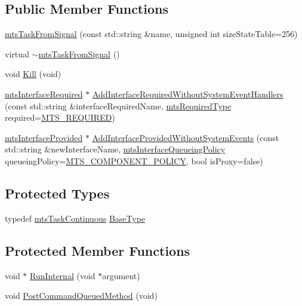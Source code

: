 \subsection*{Public Member Functions}
\begin{DoxyCompactItemize}
\item 
\hyperlink{classmts_task_from_signal_a6a5603846ff3b161a939aee0ba766350}{mts\+Task\+From\+Signal} (const std\+::string \&name, unsigned int size\+State\+Table=256)
\item 
virtual \hyperlink{classmts_task_from_signal_a4bdd61afb997d0c2e1da6697de1650a5}{$\sim$mts\+Task\+From\+Signal} ()
\item 
void \hyperlink{classmts_task_from_signal_a9a1b6e7c80ca2c2fdc14de78e3635922}{Kill} (void)
\item 
\hyperlink{classmts_interface_required}{mts\+Interface\+Required} $\ast$ \hyperlink{classmts_task_from_signal_ab3cec57b1aa96bb362249da1619c70da}{Add\+Interface\+Required\+Without\+System\+Event\+Handlers} (const std\+::string \&interface\+Required\+Name, \hyperlink{mts_forward_declarations_8h_a9ef1ce54724afde7802db326ff8606f3}{mts\+Required\+Type} required=\hyperlink{mts_forward_declarations_8h_a9ef1ce54724afde7802db326ff8606f3ae01fd85391b60e546bbb1be9716c4ec9}{M\+T\+S\+\_\+\+R\+E\+Q\+U\+I\+R\+E\+D})
\item 
\hyperlink{classmts_interface_provided}{mts\+Interface\+Provided} $\ast$ \hyperlink{classmts_task_from_signal_a3c970338699b4f96c81382af821ed8fd}{Add\+Interface\+Provided\+Without\+System\+Events} (const std\+::string \&new\+Interface\+Name, \hyperlink{mts_forward_declarations_8h_abedfb5c45b329a89b0fb647a96a7c938}{mts\+Interface\+Queueing\+Policy} queueing\+Policy=\hyperlink{mts_forward_declarations_8h_abedfb5c45b329a89b0fb647a96a7c938aff70a768b1fb65f10206583efbad12bb}{M\+T\+S\+\_\+\+C\+O\+M\+P\+O\+N\+E\+N\+T\+\_\+\+P\+O\+L\+I\+C\+Y}, bool is\+Proxy=false)
\end{DoxyCompactItemize}
\subsection*{Protected Types}
\begin{DoxyCompactItemize}
\item 
typedef \hyperlink{classmts_task_continuous}{mts\+Task\+Continuous} \hyperlink{classmts_task_from_signal_a5c3a0b848b74c8eb4d9847161a2f1cff}{Base\+Type}
\end{DoxyCompactItemize}
\subsection*{Protected Member Functions}
\begin{DoxyCompactItemize}
\item 
void $\ast$ \hyperlink{classmts_task_from_signal_a8bdcd5913b1e3928d3dbc08a96f3fe65}{Run\+Internal} (void $\ast$argument)
\item 
void \hyperlink{classmts_task_from_signal_a486fab1fb4ea5d75d53dcd49509f322d}{Post\+Command\+Queued\+Method} (void)
\end{DoxyCompactItemize}
